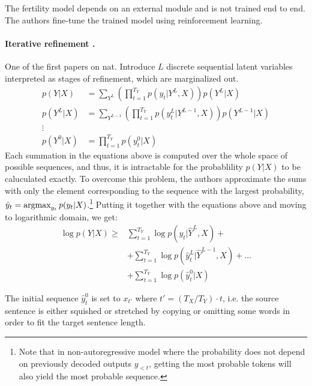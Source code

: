 The fertility model depends on an external module and is not trained end to
end. The authors fine-tune the trained model using reinforcement learning.


\paragraph{Iterative refinement \citep{lee2018deterministic}.} One of the first
papers on \gls{nat}. Introduce $L$ discrete sequential latent variables
interpreted as stages of refinement, which are marginalized out.
\begin{align*}
  p(Y|X) & = \sum_{Y^L}
           \left( \prod_{t=1}^{T_Y} p(y_t|Y^L, X) \right) p(Y^L|X) \\
  p(Y^L|X) & = \sum_{Y^{L-1}}
             \left( \prod_{t=1}^{T_Y} p(y_t^L | Y^{L-1}, X) \right)
             p(Y^{L-1}|X) \\
  \vdots \nonumber \\
  p(Y^0|X) & = \prod_{t=1}^{T_Y} p(y_t^0|X)
\end{align*}
Each summation in the equations above is computed over the whole space of
possible sequences, and thus, it is intractable for the probablility $p(Y|X)$ to
be caluculated exactly. To overcome this problem, the authors approximate the
sums with only the element corresponding to the sequence with the largest
probability, $\hat{y}_t = \operatorname*{argmax}_{y_t}p(y_t|X)$.\footnote{Note that in
  non-autoregressive model where the probability does not depend on previously
  decoded outputs $y_{<t}$, getting the most probable tokens will also yield the
  most probable sequence.}  Putting it together with the equations above and
moving to logarithmic domain, we get:
\begin{align}
  \log p(Y|X) \geq
    & \sum_{t=1}^{T_Y} \log p(y_t| \hat{Y}^L, X) + \\
    & + \sum_{t=1}^{T_Y} \log p(\hat{y}_t^{L}| \hat{Y}^{L-1}, X) + \ldots \\
    & + \sum_{t=1}^{T_Y} \log p(\hat{y}_t^0 | X) \label{eq:refinement-lowerbound}
\end{align}

The initial sequence $\hat{y}_t^0$ is set to $x_{t'}$ where
$t' = (T_X / T_Y) \cdot t$, i.e. the source sentence is either squished or
stretched by copying or omitting some words in order to fit the target sentence
length.

